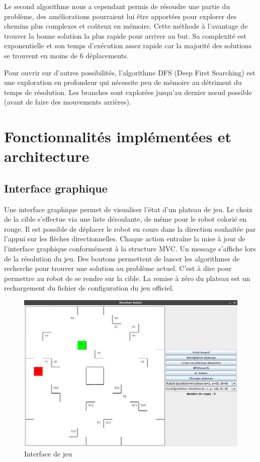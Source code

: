 \documentclass[a4paper]{article} %
\begin{document}
Le second algorithme nous a cependant permis de résoudre une partie du problème, des améliorations pourraient lui être apportées pour explorer des chemins plus complexes et coûteux en mémoire. Cette méthode à l'avantage de trouver la bonne solution la plus rapide pour arriver au but. Sa complexité est exponentielle et son temps d'exécution assez rapide car la majorité des solutions se trouvent en moins de 6 déplacements.

Pour ouvrir sur d'autres possibilités, l'algorithme DFS (Deep First Searching) est une exploration en profondeur qui nécessite peu de mémoire au détriment du temps de résolution. Les branches sont explorées jusqu'au dernier nœud possible (avant de faire des mouvements arrières).

\section{Fonctionnalités implémentées et architecture}
	\subsection{Interface graphique}
	Une interface graphique\up{\ref{interface}} permet de visualiser l'état d'un plateau de jeu. Le choix de la cible s'effectue via une liste déroulante, de même pour le robot colorié en rouge. Il est possible de déplacer le robot en cours dans la direction souhaitée par l'appui sur les flèches directionnelles.
	Chaque action entraîne la mise à jour de l'interface graphique conformément à la structure MVC. Un message s'affiche lors de la résolution du jeu.
	Des boutons permettent de lancer les algorithmes de recherche pour trouver une solution au problème actuel. C'est à dire pour permettre au robot de se rendre sur la cible.
	La remise à zéro du plateau est un rechargement du fichier de configuration du jeu officiel.

\begin{figure}[htpb]
	\begin{center}
	\includegraphics[scale=0.4]{./images/interface.png}
	\caption{Interface de jeu}\label{interface}
	\end{center}
\end{figure}
\end{document}
